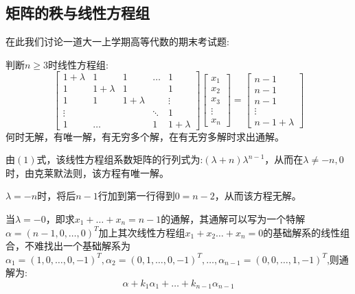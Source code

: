 \documentclass[a4paper,12pt]{ctexart}
\newenvironment{prooff}{{\noindent\it\textcolor{cyan!40!black}{Proof}:}\quad}{\par}
\begin{document}
\subsection{矩阵的秩与线性方程组}
在此我们讨论一道大一上学期高等代数的期末考试题:

判断$n\ge 3$时线性方程组:
\begin{equation*}
    \begin{bmatrix}
        1+\lambda & 1         & 1         & \dots  & 1         \\
        1         & 1+\lambda & 1         &        & 1         \\
        1         & 1         & 1+\lambda &        & \vdots    \\
        \vdots    &           &           & \ddots & 1         \\
        1         & \dots     &           & 1      & 1+\lambda
    \end{bmatrix}\begin{bmatrix}
        x_1    \\
        x_2    \\
        x_3    \\
        \vdots \\
        x_n
    \end{bmatrix}=\begin{bmatrix}
        n-1    \\
        n-1    \\
        n-1    \\
        \vdots \\
        n-1+\lambda
    \end{bmatrix}
\end{equation*}
何时无解，有唯一解，有无穷多个解，在有无穷多解时求出通解。

\begin{prooff}
    由$(1)$式，该线性方程组系数矩阵的行列式为:$(\lambda+n)\lambda^{n-1}$，从而在$\lambda\neq -n,0$时，由克莱默法则，该方程有唯一解。

    $\lambda=-n$时，将后$n-1$行加到第一行得到$0=n-2$，从而该方程无解。

    当$\lambda=-0$，即求$x_1+\dots +x_n=n-1$的通解，其通解可以写为一个特解$\alpha=(n-1,0,\dots,0)^{T}$加上其次线性方程组$x_1+x_2\dots+x_n=0$的基础解系的线性组合，不难找出一个基础解系为$\alpha_1=(1,0,\dots,0,-1)^{T},\alpha_2=(0,1,\dots,0,-1)^{T},\dots,\alpha_{n-1}=(0,0,\dots,1,-1)^{T}$,则通解为:
    \begin{equation*}
        \alpha+k_1\alpha_1+\dots+k_{n-1}\alpha_{n-1}
    \end{equation*}
\end{prooff}
\end{document}
